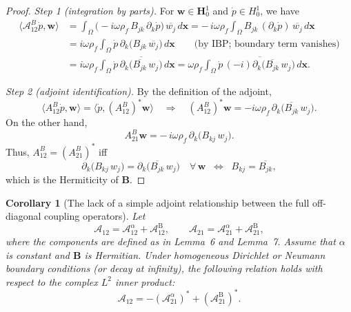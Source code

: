 \documentclass[pdflatex,sn-mathphys-num]{sn-jnl}
\theoremstyle{thmstyleone}%
\theoremstyle{thmstyletwo}%
\theoremstyle{thmstylethree}%
\def \calA {\mathcal{A}}
\def \bmw {\bm{w}}
\newtheorem{corollary}[theorem]{Corollary}
\theoremstyle{definition}
\begin{document}
	\begin{proof}
		\emph{Step 1 (integration by parts).}
		For $\bmw\in \bm{H}_{0}^{1}$ and $\dot{p}\in H^{1}_{0}$, we have
		\[
		\begin{aligned}
			\langle \calA_{12}^B \dot p, \mathbf{w}\rangle
			&= \int_\Omega \big(-i\omega\rho_f\, B_{j k}\,\partial_k \dot p\big)\,\overline{w_j}\,d\bm{x}
			= -\,i\omega\rho_f \int_\Omega B_{j k}\,(\partial_k \dot p)\,\overline{w_j}\,d\bm{x}
			\\
			&= i\omega\rho_f \int_\Omega \dot p\,\partial_k\big(B_{j k}\,\overline{w_j}\big)\,d\bm{x}
			\qquad\text{(by IBP; boundary term vanishes)}
			\\
			&= i\omega\rho_f \int_\Omega \dot p\,\overline{\partial_k\big(\overline{B_{j k}}\,w_j\big)}\,d\bm{x}
			= \omega\rho_f \int_\Omega \dot p\,\overline{(-i)\partial_k\big(\overline{B_{j k}}\,w_j\big)}\,d\bm{x}.
		\end{aligned}
		\]
		
		\emph{Step 2 (adjoint identification).}
		By the definition of the adjoint,
		\[
		\langle A_{12}^B \dot p, \mathbf{w}\rangle
		= \langle \dot p,(A_{12}^B)^{*}\mathbf{w}\rangle
		\quad\Rightarrow\quad
		(A_{12}^B)^{*}\mathbf{w} = -i\omega\rho_f\,\partial_k\big(\overline{B_{j k}}\,w_j\big).
		\]
		On the other hand,
		\[
		A_{21}^B \mathbf{w} = -\,i\omega\rho_f\,\partial_k\big(B_{k j}\,w_j\big).
		\]
		Thus, $A_{12}^B = (A_{21}^B)^{*}$ iff
		\[
		\partial_k\big(B_{k j}\,w_j\big) = \partial_k\big(\overline{B_{j k}}\,w_j\big)\quad\forall\,\mathbf{w}
		\;\;\Longleftrightarrow\;\;
		B_{k j} = \overline{B_{j k}},
		\]
		which is the Hermiticity of $\bm{B}$.
	\end{proof}
	
	
	\setcounter{theorem}{1}
	
	\begin{corollary}[The lack of a simple adjoint relationship between the full off-diagonal coupling operators]
		Let
		\[
		\mathcal{A}_{12} = \mathcal{A}_{12}^{\alpha} + \mathcal{A}_{12}^{\mathrm{B}}, 
		\qquad
		\mathcal{A}_{21} = \mathcal{A}_{21}^{\alpha} + \mathcal{A}_{21}^{\mathrm{B}},
		\]
		where the components are defined as in Lemma~6 and Lemma~7. 
		Assume that $\alpha$ is constant and $\mathbf{B}$ is Hermitian. 
		Under homogeneous Dirichlet or Neumann boundary conditions (or decay at infinity), the following relation holds with respect to the complex $L^2$ inner product:
		\[
		\mathcal{A}_{12} = -(\mathcal{A}_{21}^{\alpha})^* + (\mathcal{A}_{21}^{\mathrm{B}})^*.
		\]
	\end{corollary}
	
\end{document}
